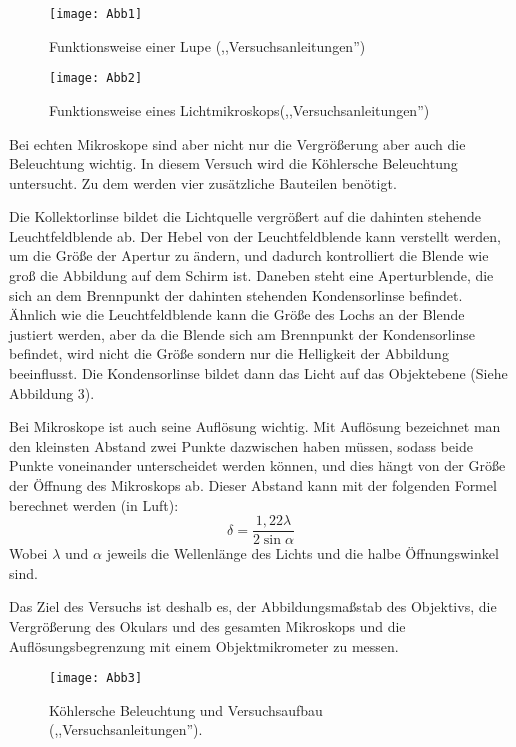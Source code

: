 \documentclass[11pt,a4paper]{article}
\begin{document}
\begin{figure}
	\centering
	\texttt{[image: Abb1]}
	\caption{Funktionsweise einer Lupe (,,Versuchsanleitungen'')}
\end{figure}

\begin{figure}
	\centering
	\texttt{[image: Abb2]}
	\caption{Funktionsweise eines Lichtmikroskops(,,Versuchsanleitungen'')}
\end{figure}

Bei echten Mikroskope sind aber nicht nur die Vergrößerung aber auch die Beleuchtung wichtig. In diesem Versuch wird die Köhlersche Beleuchtung untersucht. Zu dem werden vier zusätzliche Bauteilen benötigt. 

Die Kollektorlinse bildet die Lichtquelle vergrößert auf die dahinten stehende Leuchtfeldblende ab. Der Hebel von der Leuchtfeldblende kann verstellt werden, um die Größe der Apertur zu ändern, und dadurch kontrolliert die Blende wie groß die Abbildung auf dem Schirm ist. Daneben steht eine Aperturblende, die sich an dem Brennpunkt der dahinten stehenden Kondensorlinse befindet. Ähnlich wie die Leuchtfeldblende kann die Größe des Lochs an der Blende justiert werden, aber da die Blende sich am Brennpunkt der Kondensorlinse befindet, wird nicht die Größe sondern nur die Helligkeit der Abbildung beeinflusst. Die Kondensorlinse bildet dann das Licht auf das Objektebene (Siehe Abbildung 3).

Bei Mikroskope ist auch seine Auflösung wichtig. Mit Auflösung bezeichnet man den kleinsten Abstand zwei Punkte dazwischen haben müssen, sodass beide Punkte voneinander unterscheidet werden können, und dies hängt von der Größe der Öffnung des Mikroskops ab. Dieser Abstand kann mit der folgenden Formel berechnet werden (in Luft):
\begin{equation}
\delta = \frac{1,22\lambda}{2 \sin \alpha}
\end{equation}
Wobei $\lambda$ und $\alpha$ jeweils die Wellenlänge des Lichts und die halbe Öffnungswinkel sind. 

Das Ziel des Versuchs ist deshalb es, der Abbildungsmaßstab des Objektivs, die Vergrößerung des Okulars und des gesamten Mikroskops und die Auflösungsbegrenzung mit einem Objektmikrometer zu messen. 

\begin{figure}
	\centering
	\texttt{[image: Abb3]}
	\caption{Köhlersche Beleuchtung und Versuchsaufbau (,,Versuchsanleitungen'').}
\end{figure}
\end{document}
